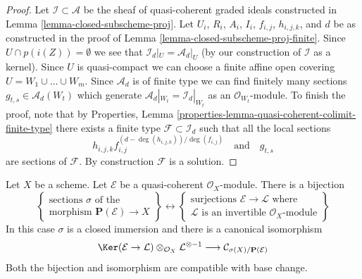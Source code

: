 \begin{proof}
Let $\mathcal{I} \subset \mathcal{A}$ be the sheaf of quasi-coherent
graded ideals constructed in Lemma \ref{lemma-closed-subscheme-proj}.
Let $U_i$, $R_i$, $A_i$, $I_i$, $f_{i, j}$, $h_{i, j, k}$, and $d$
be as constructed in the proof of
Lemma \ref{lemma-closed-subscheme-proj-finite}.
Since $U \cap p(i(Z)) = \emptyset$ we see that
$\mathcal{I}_d|_U = \mathcal{A}_d|_U$ (by our construction of
$\mathcal{I}$ as a kernel). Since $U$ is quasi-compact we
can choose a finite affine open covering $U = W_1 \cup \ldots \cup W_m$.
Since $\mathcal{A}_d$ is of finite type we can find finitely many sections
$g_{t, s} \in \mathcal{A}_d(W_t)$ which generate
$\mathcal{A}_d|_{W_t} = \mathcal{I}_d|_{W_t}$
as an $\mathcal{O}_{W_t}$-module. To finish the proof, note that by
Properties, Lemma \ref{properties-lemma-quasi-coherent-colimit-finite-type}
there exists a finite type $\mathcal{F} \subset \mathcal{I}_d$
such that all the local sections
$$
h_{i, j, k}f_{i, j}^{(d - \deg(h_{i, j, k}))/\deg(f_{i, j})}
\quad\text{and}\quad
g_{t, s}
$$
are sections of $\mathcal{F}$. By construction $\mathcal{F}$ is a solution.
\end{proof}

\begin{lemma}
\label{lemma-conormal-sheaf-section-projective-bundle}
Let $X$ be a scheme. Let $\mathcal{E}$ be a quasi-coherent
$\mathcal{O}_X$-module. There is a bijection
$$
\left\{
\begin{matrix}
\text{sections }\sigma\text{ of the } \\
\text{morphism } \mathbf{P}(\mathcal{E}) \to X
\end{matrix}
\right\}
\leftrightarrow
\left\{
\begin{matrix}
\text{surjections }\mathcal{E} \to \mathcal{L}\text{ where} \\
\mathcal{L}\text{ is an invertible }\mathcal{O}_X\text{-module}
\end{matrix}
\right\}
$$
In this case $\sigma$ is a closed immersion and there is a canonical
isomorphism
$$
\Ker(\mathcal{E} \to \mathcal{L})
\otimes_{\mathcal{O}_X} \mathcal{L}^{\otimes -1}
\longrightarrow
\mathcal{C}_{\sigma(X)/\mathbf{P}(\mathcal{E})}
$$
Both the bijection and isomorphism are compatible with base change.
\end{lemma}


